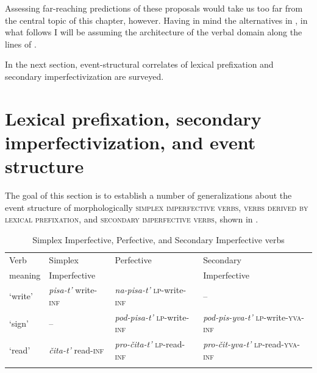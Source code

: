 \documentclass[output=paper,colorlinks,citecolor=brown]{langscibook}
\begin{document}
Assessing far-reaching predictions of these proposals would take us too far from the central topic of this chapter, however. Having in mind the alternatives in , in what follows I will be assuming the architecture of the verbal domain along the lines of . 

In the next section, event-structural correlates of lexical prefixation and secondary imperfectivization are surveyed.

\section{Lexical prefixation, secondary imperfectivization, and event structure}\label{tat:sec:2}
\hypertarget{RefHeadingToc164647621}{}
The goal of this section is to establish a number of generalizations about the event structure of morphologically \textsc{simplex} \textsc{imperfective verbs}, \textsc{verbs derived by lexical prefixation}, and \textsc{secondary imperfective verbs}, shown in .

\begin{table}
\caption{Simplex Imperfective, Perfective, and Secondary Imperfective verbs}
\label{tab:key:3}
\begin{tabularx}{\textwidth}{XXXX}
\lsptoprule
Verb  & Simplex & Perfective & Secondary \\
meaning & Imperfective & & Imperfective\\\midrule
‘write’ & \textit{pisa-t’} \newline write-\textsc{inf} & \textit{na-pisa-t’} \newline \textsc{lp}-write-\textsc{inf}\smallskip & --\\
‘sign’ & -- & \textit{pod-pisa-t’} \newline \textsc{lp}-write-\textsc{inf} & \textit{pod-pis-yva-t’} \newline \textsc{lp}-write-\textsc{yva}-\textsc{inf}\smallskip\\
‘read’ & \textit{čita-t’} \newline read-\textsc{inf} & \textit{pro-čita-t’} \newline \textsc{lp}-read-\textsc{inf} & \textit{pro-čit-yva-t’} \newline \textsc{lp}-read-\textsc{yva}-\textsc{inf}\\
\lspbottomrule
\end{tabularx}
\end{table}
\end{document}

